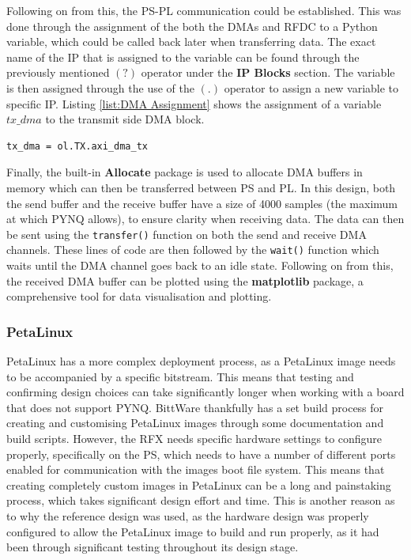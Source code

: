 \documentclass[12pt, a4paper]{article}
\begin{document}
Following on from this, the PS-PL communication could be established. This was done through the assignment of the both the DMAs and RFDC to a Python variable, which could be called back later when transferring data. The exact name of the IP that is assigned to the variable can be found through the previously mentioned $(?)$ operator under the \textbf{IP Blocks} section. The variable is then assigned through the use of the $(.)$ operator to assign a new variable to specific IP. Listing \ref{list:DMA Assignment} shows the assignment of a variable $tx\_dma$ to the transmit side DMA block.

\begin{listing}[h]
\begin{verbatim}
tx_dma = ol.TX.axi_dma_tx
\end{verbatim}
\caption{Python DMA Variable Assignment}
\label{list:DMA Assignment}
\end{listing}

Finally, the built-in \textbf{Allocate} package is used to allocate DMA buffers in memory which can then be transferred between PS and PL. In this design, both the send buffer and the receive buffer have a size of 4000 samples (the maximum at which PYNQ allows), to ensure clarity when receiving data. The data can then be sent using the \texttt{transfer()} function on both the send and receive DMA channels. These lines of code are then followed by the \texttt{wait()} function which waits until the DMA channel goes back to an idle state. Following on from this, the received DMA buffer can be plotted using the \textbf{matplotlib} package, a comprehensive tool for data visualisation and plotting.


\subsubsection{PetaLinux}

PetaLinux has a more complex deployment process, as a PetaLinux image needs to be accompanied by a specific bitstream. This means that testing and confirming design choices can take significantly longer when working with a board that does not support PYNQ. BittWare thankfully has a set build process for creating and customising PetaLinux images through some documentation and build scripts. However, the RFX needs specific hardware settings to configure properly, specifically on the PS, which needs to have a number of different ports enabled for communication with the images boot file system. This means that creating completely custom images in PetaLinux can be a long and painstaking process, which takes significant design effort and time. This is another reason as to why the reference design was used, as the hardware design was properly configured to allow the PetaLinux image to build and run properly, as it had been through significant testing throughout its design stage.
\end{document}
